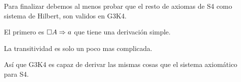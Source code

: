 Para finalizar debemos al menos probar que el resto de axiomas de S4 como sistema de Hilbert, son validos en G3K4.

El primero es $\square A \Rightarrow a$ que tiene una derivación simple.



La transitividad es solo un poco mas complicada.



Así que G3K4 es capaz de derivar las mismas cosas que el sistema axiomático para S4.

